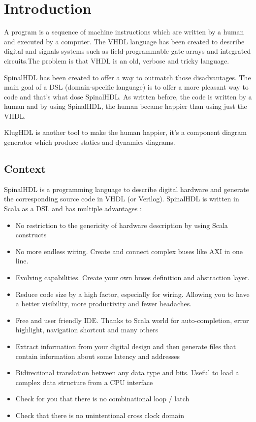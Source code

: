\chapter{Introduction}
\label{cha:Introduction}

A program is a sequence of machine instructions which are written by a
human and executed by a computer. The VHDL language has been created to describe
digital and signals systems such as field-programmable gate arrays and
integrated circuits\cite{wiki-vhdl}.The problem is that VHDL is an old, verbose
and tricky language.

SpinalHDL has been created to offer a way to outmatch those disadvantages. The
main goal of a DSL (domain-specific language) is to offer a more pleasant way to
code and that's what dose SpinalHDL. As written before, the code is written by a
human and by using SpinalHDL, the human became happier than using just the VHDL.

KlugHDL is another tool to make the human happier, it's a component diagram
generator which produce statics and dynamics diagrams.

\section{Context}
\label{sec:Context}

SpinalHDL is a programming language to describe digital hardware and generate
the corresponding source code in VHDL (or Verilog). SpinalHDL is written in Scala as a DSL
and has multiple advantages\cite{github-spinalhdl} :
\begin{itemize}
    \item No restriction to the genericity of hardware description by using
      Scala constructs
    \item No more endless wiring. Create and connect complex buses like AXI in one line.
    \item Evolving capabilities. Create your own buses definition and abstraction layer.
    \item Reduce code size by a high factor, especially for wiring. Allowing you
      to have a better visibility, more productivity and fewer headaches.
    \item Free and user friendly IDE. Thanks to Scala world for auto-completion,
      error highlight, navigation shortcut and many others
    \item Extract information from your digital design and then generate files
      that contain information about some latency and addresses
    \item Bidirectional translation between any data type and bits. Useful to
      load a complex data structure from a CPU interface
    \item Check for you that there is no combinational loop / latch
    \item Check that there is no unintentional cross clock domain
\end{itemize}

